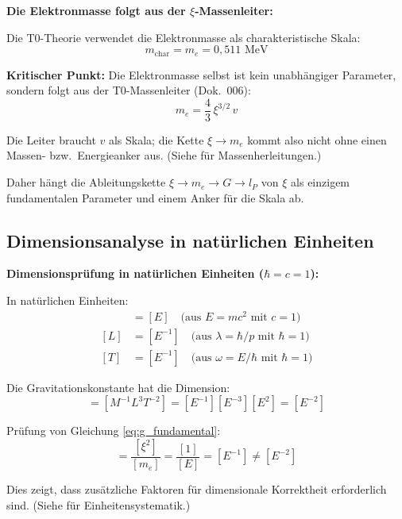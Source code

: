 	\begin{insight}
		\textbf{Die Elektronmasse folgt aus der $\xi$-Massenleiter:}
		
		Die T0-Theorie verwendet die Elektronmasse als charakteristische Skala:
		\begin{equation}
			m_{\text{char}} = m_e = 0{,}511 \text{ MeV}
			\label{eq:characteristic_mass}
		\end{equation}
		
		\textbf{Kritischer Punkt:} Die Elektronmasse selbst ist kein unabhängiger Parameter, sondern folgt aus der T0-Massenleiter (Dok.~006):
		\begin{equation}
			m_e = \frac{4}{3}\,\xi^{3/2}\,v
		\end{equation}
		
		Die Leiter braucht $v$ als Skala; die Kette $\xi \to m_e$ kommt also nicht ohne einen Massen- bzw.\ Energieanker aus. (Siehe \cite{T0_Teilchenmassen_De} für Massenherleitungen.)
		
		Daher hängt die Ableitungskette $\xi \to m_e \to G \to l_P$ von $\xi$ als einzigem fundamentalen Parameter und einem Anker für die Skala ab.
	\end{insight}

	\subsection{Dimensionsanalyse in natürlichen Einheiten}
	
	\begin{derivation}
		\textbf{Dimensionsprüfung in natürlichen Einheiten ($\hbar = c = 1$):}
		
		In natürlichen Einheiten:
		\begin{align}
			[M] &= [E] \quad \text{(aus } E = mc^2 \text{ mit } c = 1\text{)} \\
			[L] &= [E^{-1}] \quad \text{(aus } \lambda = \hbar/p \text{ mit } \hbar = 1\text{)} \\
			[T] &= [E^{-1}] \quad \text{(aus } \omega = E/\hbar \text{ mit } \hbar = 1\text{)}
		\end{align}
		
		Die Gravitationskonstante hat die Dimension:
		\begin{equation}
			[G] = [M^{-1}L^3T^{-2}] = [E^{-1}][E^{-3}][E^2] = [E^{-2}]
		\end{equation}
		
		Prüfung von Gleichung \eqref{eq:g_fundamental}:
		\begin{equation}
			[G] = \frac{[\xi^2]}{[m_e]} = \frac{[1]}{[E]} = [E^{-1}] \neq [E^{-2}]
		\end{equation}
		
		Dies zeigt, dass zusätzliche Faktoren für dimensionale Korrektheit erforderlich sind. (Siehe \cite{NatEinheitenSystematik_De} für Einheitensystematik.)
	\end{derivation}
	
